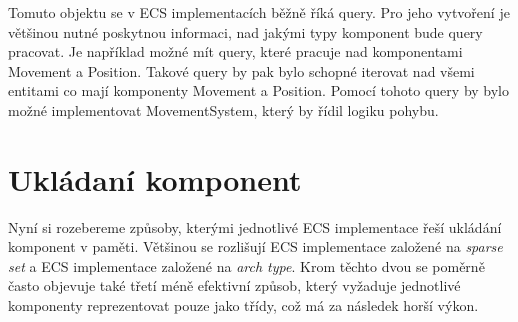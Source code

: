 Tomuto objektu se v ECS implementacích běžně říká query. Pro jeho vytvoření je většinou nutné poskytnou informaci, nad jakými typy komponent bude query pracovat. Je například možné mít query, které pracuje nad komponentami Movement a Position. Takové query by pak bylo schopné iterovat nad všemi entitami co mají komponenty Movement a Position. Pomocí tohoto query by bylo možné implementovat MovementSystem, který by řídil logiku pohybu.






\section{Ukládaní komponent}
Nyní si rozebereme způsoby, kterými jednotlivé ECS implementace řeší ukládání komponent v paměti. Většinou se rozlišují ECS implementace založené na \textit{sparse set} a ECS implementace založené na \textit{arch type}. Krom těchto dvou se poměrně často objevuje také třetí méně efektivní způsob, který vyžaduje jednotlivé komponenty reprezentovat pouze jako třídy, což má za následek horší výkon.

